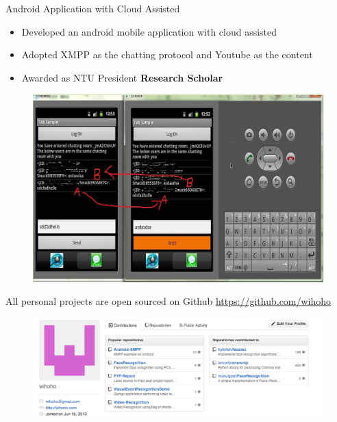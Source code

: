 \documentclass{beamer}
\begin{document}
\begin{frame}{Android Application with Cloud Assisted}
	\begin{itemize}
		\item {Developed an android mobile application with cloud assisted}
		\item {Adopted XMPP as the chatting protocol and Youtube as the content}
		\item {Awarded as NTU President \textbf{Research Scholar}}
	\end{itemize}

		\begin{figure}[!ht]
     	\centering
        	\includegraphics[scale=0.18]{./android.png}
    	\end{figure}
\end{frame}

\begin{frame}
	\begin{center}
		\Large{All personal projects are open sourced on Github}
		\url{https://github.com/wihoho}
	\end{center}

			\begin{figure}[!ht]
     	\centering
        	\includegraphics[scale=0.3]{./github.png}
    	\end{figure}
\end{frame}
\end{document}
